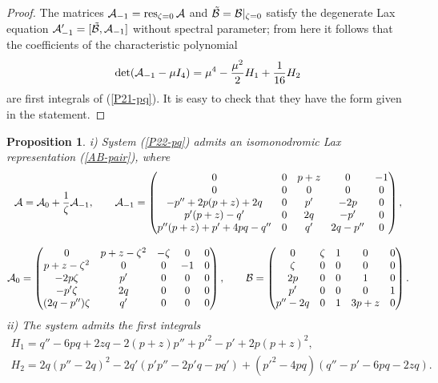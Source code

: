 \documentclass[11pt]{article}
\theoremstyle{plain}
\newtheorem{proposition}{Proposition}
\theoremstyle{definition}
\begin{document}
\begin{proof}
The matrices ${\cal A}_{-1}=\operatorname*{res}_{\zeta=0}{\cal A}$ and $\tilde{\cal B}={\cal B}|_{\zeta=0}$ satisfy the degenerate Lax equation ${\cal A}'_{-1}=[\tilde{\cal B},{\cal A}_{-1}]$ without spectral parameter; from here it follows that the coefficients of the characteristic polynomial  
\[
 \det({\cal A}_{-1}-\mu I_4)=\mu^4-\frac{\mu^2}{2}H_1+\frac{1}{16}H_2
\]
are first integrals of (\ref{P21-pq}). It is easy to check that they have the form given in the statement.
\end{proof}

\begin{proposition} 
i) System (\ref{P22-pq}) admits an isomonodromic Lax representation (\ref{AB-pair}), where  
\begin{gather*}
 {\cal A}={\cal A}_0+\frac{1}{\zeta}{\cal A}_{-1},\qquad
 {\cal A}_{-1}=
 \begin{pmatrix}
  0 & 0 & p+z & 0 & -1 \\
  0 & 0 & 0 & 0 & 0 \\
  -p''+2p(p+z)+2q & 0 & p' & -2p & 0 \\
  p'(p+z)-q' & 0 & 2q & -p' & 0 \\
  p''(p+z)+p'+4pq-q'' & 0 & q' & 2q-p'' & 0 
 \end{pmatrix},\\[3mm]
 {\cal A}_0=
 \begin{pmatrix}
  0 & p+z-\zeta^2 & -\zeta & 0 & 0 \\
  p+z-\zeta^2 & 0 & 0 & -1 & 0 \\
 -2p\zeta & p' & 0 & 0 & 0 \\
 -p'\zeta & 2q & 0 & 0 & 0 \\
 (2q-p'')\zeta & q' & 0 & 0 & 0 
 \end{pmatrix},\qquad
 {\cal B}=
 \begin{pmatrix}
  0 & \zeta  & 1 & 0 & 0 \\
  \zeta & 0 & 0 & 0 & 0 \\
  2p & 0 & 0 & 1 & 0 \\
  p' & 0 & 0 & 0 & 1 \\
  p''-2q & 0 & 1 & 3p+z & 0
 \end{pmatrix}.
\end{gather*}
ii) The system admits the first integrals 
\begin{gather*}
H_1=q''-6pq+2zq-2(p+z)p''+p'^2-p'+2p(p+z)^2,\\
H_2= 2q(p''-2q)^2-2q'(p'p''-2p'q-pq')+(p'^2-4pq)(q''-p'-6pq-2zq).
\end{gather*}
\end{proposition}
\end{document}
